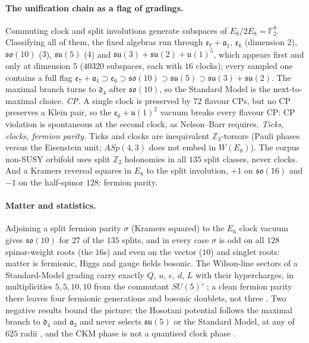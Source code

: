 \paragraph{The unification chain as a flag of gradings.}
Commuting clock and split involutions generate subspaces of $E_8/2E_8=\mathbb F_2^8$. Classifying all of them, the
fixed algebras run through $\mathfrak e_7+\mathfrak a_1$, $\mathfrak e_6$ (dimension $2$),
$\mathfrak{so}(10)$ ($3$), $\mathfrak{su}(5)$ ($4$) and $\mathfrak{su}(3)+\mathfrak{su}(2)+\mathfrak u(1)^5$,
which appears first and only at dimension $5$ ($40320$ subspaces, each with $16$ clocks); every sampled one contains a
full flag $\mathfrak e_7+\mathfrak a_1\supset\mathfrak e_6\supset\mathfrak{so}(10)\supset\mathfrak{su}(5)\supset\mathfrak{su}(3)+\mathfrak{su}(2)$.
The maximal branch turns to $\mathfrak d_4$ after $\mathfrak{so}(10)$, so the Standard Model is the next-to-maximal choice. 
\emph{CP.} A single clock is preserved by $72$ flavour CPs, but no CP preserves a Klein pair, so the $\mathfrak e_6+\mathfrak u(1)^2$
vacuum breaks every flavour CP: CP violation is spontaneous at the second clock, as Nelson--Barr requires. 
\emph{Ticks, clocks, fermion parity.} Ticks and clocks are inequivalent $\mathbb Z_3$-torsors (Pauli phases versus the
Eisenstein unit; $ASp(4,3)$ does not embed in $W(E_8)$).  The corpus non-SUSY orbifold uses split $\mathbb Z_2$
holonomies in all $135$ split classes, never clocks.  And a Kramers reversal squares in $E_8$ to the split
involution, $+1$ on $\mathfrak{so}(16)$ and $-1$ on the half-spinor $128$: fermion parity. 

\paragraph{Matter and statistics.}
Adjoining a split fermion parity $\sigma$ (Kramers squared) to the $E_6$ clock vacuum gives $\mathfrak{so}(10)$ for $27$ of
the $135$ splits, and in every case $\sigma$ is odd on all $128$ spinor-weight roots (the $16$s) and even on the vector
($10$) and singlet roots: matter is fermionic, Higgs and gauge fields bosonic. 
The Wilson-line sectors of a Standard-Model grading carry exactly $Q$, $u$, $e$, $d$, $L$ with their hypercharges, in
multiplicities $5,5,10,10$ from the commutant $SU(5)'$ ; a clean fermion parity there leaves four
fermionic generations and bosonic doublets, not three . Two negative results bound the picture:
the Hosotani potential follows the maximal branch to $\mathfrak d_4$ and $\mathfrak a_3$ and never selects
$\mathfrak{su}(5)$ or the Standard Model, at any of $625$ radii , and the CKM phase is not a quantised
clock phase .

